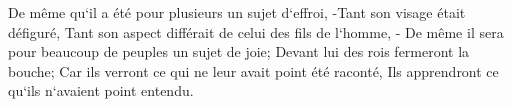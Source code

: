 \verse De même qu`il a été pour plusieurs un sujet d`effroi, -Tant son visage était défiguré, Tant son aspect différait de celui des fils de l`homme, - 
\verse De même il sera pour beaucoup de peuples un sujet de joie; Devant lui des rois fermeront la bouche; Car ils verront ce qui ne leur avait point été raconté, Ils apprendront ce qu`ils n`avaient point entendu. 

\chapter{}

